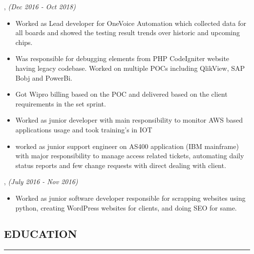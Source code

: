 \documentclass[10pt,a4]{article}
\def\mydot{\textcolor{deep_blue}{\rule{0.75ex}{0.75ex}}}
\begin{document}
\begin{small}
, {\em \color{drkgray}(Dec 2016 -  Oct 2018)}

\begin{itemize}
\item[\mydot] Worked as Lead developer for OneVoice Automation which collected data for all boards and showed the testing result trends over historic and upcoming chips.

\item[\mydot] Was responsible for debugging elements from PHP CodeIgniter website having legacy codebase. Worked on multiple POCs including QlikView, SAP Bobj and PowerBi.

\item[\mydot] Got Wipro billing based on the POC and delivered based on the client requirements in the set sprint.

\item[\mydot] Worked as junior developer with main responsibility to monitor AWS based applications usage and took training's in IOT

\item[\mydot] worked as junior support engineer on AS400 application (IBM mainframe) with major responsibility to manage access related tickets, automating daily status reports and few change requests with direct dealing with client.

\end{itemize}

, {\em \color{drkgray}(July 2016 - Nov 2016)}
\begin{itemize}
\item[\mydot] Worked as junior software developer responsible for scrapping websites using python, creating WordPress websites for clients, and doing SEO for same.
\end{itemize}


\vspace{-0.55cm}
\subsection*{\color{dark_blue}EDUCATION}
\vspace{-0.15cm}
\hrule
\vspace{0.1cm}


\end{small}
\end{document}
